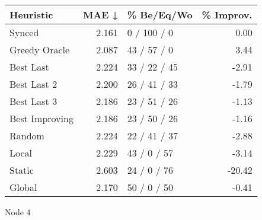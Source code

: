 \begin{tabular}{lrlr}
\toprule
\textbf{Heuristic} & \textbf{MAE ↓} & \textbf{\% Be/Eq/Wo} & \textbf{\% Improv.} \\
\midrule
            Synced &          2.161 &          0 / 100 / 0 &                0.00 \\
     Greedy Oracle &          2.087 &          43 / 57 / 0 &                3.44 \\
         Best Last &          2.224 &         33 / 22 / 45 &               -2.91 \\
       Best Last 2 &          2.200 &         26 / 41 / 33 &               -1.79 \\
       Best Last 3 &          2.186 &         23 / 51 / 26 &               -1.13 \\
    Best Improving &          2.186 &         23 / 50 / 26 &               -1.16 \\
            Random &          2.224 &         22 / 41 / 37 &               -2.88 \\
             Local &          2.229 &          43 / 0 / 57 &               -3.14 \\
            Static &          2.603 &          24 / 0 / 76 &              -20.42 \\
            Global &          2.170 &          50 / 0 / 50 &               -0.41 \\
\bottomrule
\end{tabular}
\caption{Node 4}
\label{tab:hr_iid_lr05_le1_bs2_4}
